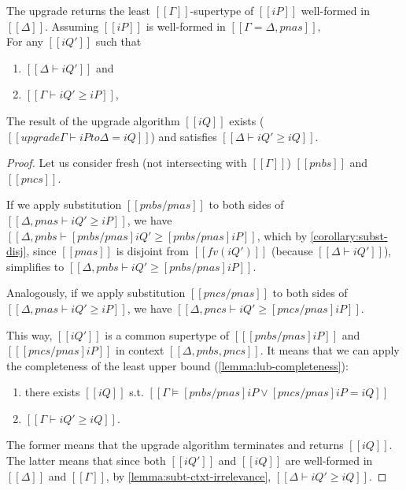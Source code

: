 \begin{lemma} \label{lemma:upgrade-completeness}
    The upgrade returns the least $[[Γ]]$-supertype of $[[iP]]$ well-formed in $[[Δ]]$.
    Assuming $[[iP]]$ is well-formed in $[[Γ = Δ, pnas]],$\\
    For any $[[iQ']]$ such that 
    \begin{enumerate}
        \item $[[Δ ⊢ iQ']]$ and
        \item $[[Γ ⊢ iQ' ≥ iP]]$,
    \end{enumerate}

    The result of the upgrade algorithm $[[iQ]]$ exists
    ($[[upgrade Γ ⊢ iP to Δ = iQ]]$) and satisfies $[[Δ ⊢ iQ' ≥ iQ]]$.
\end{lemma}
\begin{proof}

    Let us consider fresh (not intersecting with $[[Γ]]$) $[[pnbs]]$ and $[[pncs]]$.

    If we apply substitution $[[pnbs/pnas]]$ to both sides of $[[Δ, pnas ⊢ iQ' ≥ iP]]$,
    we have $[[Δ, pnbs ⊢ [pnbs/pnas]iQ' ≥ [pnbs/pnas]iP]]$, which by  
    \cref{corollary:subst-disj}, since $[[pnas]]$ is disjoint from $[[fv(iQ')]]$
    (because $[[Δ ⊢ iQ']]$), simplifies to $[[Δ, pnbs ⊢ iQ' ≥ [pnbs/pnas]iP]]$.

    Analogously, if we apply substitution $[[pncs/pnas]]$ to both sides of $[[Δ, pnas ⊢ iQ' ≥ iP]]$,
    we have $[[Δ, pncs ⊢ iQ' ≥ [pncs/pnas]iP]]$.

    This way, $[[iQ']]$ is a common supertype of $[[ [pnbs/pnas]iP ]]$ and $[[ [pncs/pnas]iP ]]$ in
    context $[[Δ, pnbs, pncs]]$. It means that we can apply the completeness of the least upper bound
    (\cref{lemma:lub-completeness}):
    \begin{enumerate}
        \item there exists $[[iQ]]$ s.t. $[[Γ ⊨ [pnbs/pnas]iP ∨ [pncs/pnas]iP = iQ]]$ 
        \item $[[Γ ⊢ iQ' ≥ iQ]]$.
    \end{enumerate}
    The former means that the upgrade algorithm terminates and returns $[[iQ]]$.
    The latter means that since both 
    $[[iQ']]$ and $[[iQ]]$ are well-formed in $[[Δ]]$ and $[[Γ]]$,
    by \cref{lemma:subt-ctxt-irrelevance}, $[[Δ ⊢ iQ' ≥ iQ]]$.
\end{proof}


